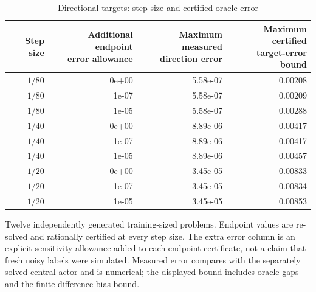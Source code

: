 \begin{table}[p]\centering
\caption{Directional targets: step size and certified oracle error}\label{tab:r12-fd}
\setlength{\tabcolsep}{3.5pt}\begin{tabular}{rrrr}
\toprule
Step size & \shortstack{Additional endpoint\\error allowance} & \shortstack{Maximum measured\\direction error} & \shortstack{Maximum certified\\target-error bound} \\
\midrule
$1/80$ & 0e+00 & 5.58e-07 & 0.00208 \\
$1/80$ & 1e-07 & 5.58e-07 & 0.00209 \\
$1/80$ & 1e-05 & 5.58e-07 & 0.00288 \\
$1/40$ & 0e+00 & 8.89e-06 & 0.00417 \\
$1/40$ & 1e-07 & 8.89e-06 & 0.00417 \\
$1/40$ & 1e-05 & 8.89e-06 & 0.00457 \\
$1/20$ & 0e+00 & 3.45e-05 & 0.00833 \\
$1/20$ & 1e-07 & 3.45e-05 & 0.00834 \\
$1/20$ & 1e-05 & 3.45e-05 & 0.00853 \\
\bottomrule
\end{tabular}
\begin{minipage}{.98\textwidth}\small
Twelve independently generated training-sized problems. Endpoint values are re-solved and rationally certified at every step size. The extra error column is an explicit sensitivity allowance added to each endpoint certificate, not a claim that fresh noisy labels were simulated. Measured error compares with the separately solved central actor and is numerical; the displayed bound includes oracle gaps and the finite-difference bias bound.
\end{minipage}
\end{table}
